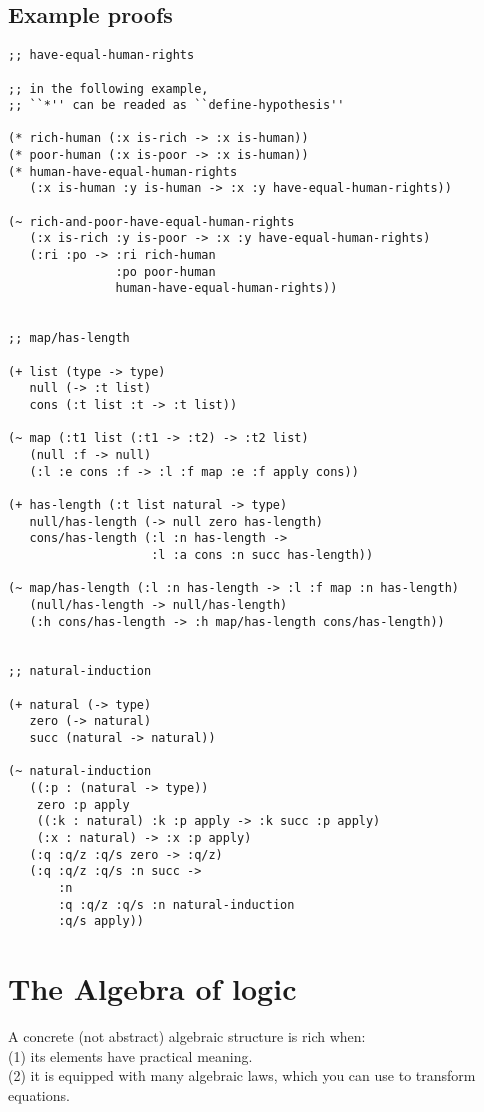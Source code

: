 \documentclass[numbers]{sigplanconf}
\begin{document}
\newpage

\subsection{Example proofs}

{\scriptsize\begin{verbatim}
;; have-equal-human-rights

;; in the following example,
;; ``*'' can be readed as ``define-hypothesis''

(* rich-human (:x is-rich -> :x is-human))
(* poor-human (:x is-poor -> :x is-human))
(* human-have-equal-human-rights
   (:x is-human :y is-human -> :x :y have-equal-human-rights))

(~ rich-and-poor-have-equal-human-rights
   (:x is-rich :y is-poor -> :x :y have-equal-human-rights)
   (:ri :po -> :ri rich-human
               :po poor-human
               human-have-equal-human-rights))


;; map/has-length

(+ list (type -> type)
   null (-> :t list)
   cons (:t list :t -> :t list))

(~ map (:t1 list (:t1 -> :t2) -> :t2 list)
   (null :f -> null)
   (:l :e cons :f -> :l :f map :e :f apply cons))

(+ has-length (:t list natural -> type)
   null/has-length (-> null zero has-length)
   cons/has-length (:l :n has-length ->
                    :l :a cons :n succ has-length))

(~ map/has-length (:l :n has-length -> :l :f map :n has-length)
   (null/has-length -> null/has-length)
   (:h cons/has-length -> :h map/has-length cons/has-length))


;; natural-induction

(+ natural (-> type)
   zero (-> natural)
   succ (natural -> natural))

(~ natural-induction
   ((:p : (natural -> type))
    zero :p apply
    ((:k : natural) :k :p apply -> :k succ :p apply)
    (:x : natural) -> :x :p apply)
   (:q :q/z :q/s zero -> :q/z)
   (:q :q/z :q/s :n succ ->
       :n
       :q :q/z :q/s :n natural-induction
       :q/s apply))
\end{verbatim}}

\section{The Algebra of logic}

A concrete (not abstract) algebraic structure is rich when: \\
(1) its elements have practical meaning. \\
(2) it is equipped with many algebraic laws, which you can use to transform equations.
\end{document}
